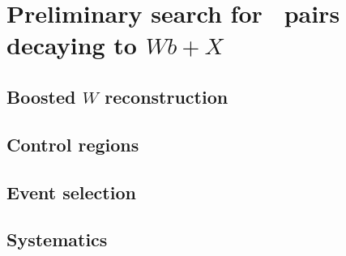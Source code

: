 \clearpage{\pagestyle{empty}\cleardoublepage}

\chapter{Preliminary search for \TTbar\ pairs decaying to $Wb+X$}\label{chap:wbx}

\section{Boosted $W$ reconstruction}\label{sec:boostedW}

\section{Control regions}\label{sec:wbxCR}

\section{Event selection}\label{sec:wbxEVT}



\section{Systematics}\label{sec:wbxSYS}
